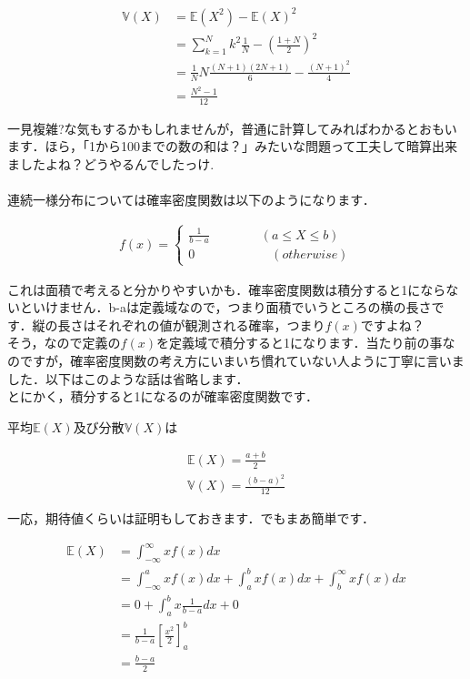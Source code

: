 \documentclass[11pt,a4paper,uplatex]{ujreport} 	%
\begin{document}
\begin{align}
\mathbb{V}(X) &= \mathbb{E}(X^2) - \mathbb{E}(X)^2\\
&= \sum_{k=1}^N k^2 \frac{1}{N} - {(\frac{1+N}{2})}^2\\
&= \frac{1}{N}N\frac{(N+1)(2N+1)}{6}-\frac{(N+1)^2}{4}\\
&= \frac{N^2-1}{12}
\end{align}

一見複雑?な気もするかもしれませんが，普通に計算してみればわかるとおもいます．ほら，「1から100までの数の和は？」みたいな問題って工夫して暗算出来ましたよね？どうやるんでしたっけ.\\
\\

連続一様分布については確率密度関数は以下のようになります．

\begin{align}
f(x) = 
\left\{
    \begin{array}{l}
      \frac{1}{b-a} \qquad \qquad  (a \leq X \leq b) \\
      0  \qquad \qquad \qquad(otherwise)
    \end{array}
  \right.
\end{align}

これは面積で考えると分かりやすいかも．確率密度関数は積分すると1にならないといけません．b-aは定義域なので，つまり面積でいうところの横の長さです．縦の長さはそれぞれの値が観測される確率，つまり$f(x)$ですよね？\\

そう，なので定義の$f(x)$を定義域で積分すると1になります．当たり前の事なのですが，確率密度関数の考え方にいまいち慣れていない人ように丁寧に言いました．以下はこのような話は省略します．\\

とにかく，積分すると1になるのが確率密度関数です．


平均$\mathbb{E}(X)$及び分散$\mathbb{V}(X)$は

\begin{align}
\mathbb{E}(X) = \frac{a+b}{2}\\
\mathbb{V}(X) = \frac{(b-a)^2}{12}
\end{align}

一応，期待値くらいは証明もしておきます．でもまあ簡単です．

\begin{align}
\mathbb{E}(X)  &= \int_{-\infty}^{\infty} xf(x) dx \\
&= \int_{-\infty}^{a} xf(x) dx + \int_{a}^{b} xf(x) dx + \int_{b}^{\infty} xf(x) dx \\
&= 0 + \int_{a}^{b} x\frac{1}{b-a} dx + 0\\
&= \frac{1}{b-a}\left[\frac{x^2}{2}\right]_a^b\\
& = \frac{b-a}{2}
\end{align}
\end{document}
